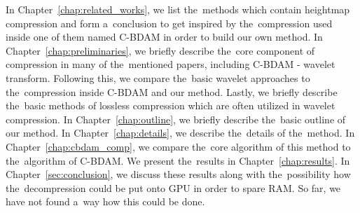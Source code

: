 In Chapter~\ref{chap:related_works}, we list the~methods which contain heightmap compression and form a~conclusion to get inspired by the~compression used inside one of them named C-BDAM in order to build our own method. In Chapter~\ref{chap:preliminaries}, we briefly describe the~core component of compression in many of the~mentioned papers, including C-BDAM - wavelet transform. Following this, we compare the~basic wavelet approaches to the~compression inside C-BDAM and our method. Lastly, we briefly describe the~basic methods of lossless compression which are often utilized in wavelet compression. In Chapter~\ref{chap:outline}, we briefly describe the~basic outline of our method. In Chapter~\ref{chap:details}, we describe the~details of the~method. In Chapter~\ref{chap:cbdam_comp}, we compare the~core algorithm of this method to the~algorithm of C-BDAM. We present the~results in Chapter~\ref{chap:results}. In Chapter~\ref{sec:conclusion}, we discuss these results along with the~possibility how the~decompression could be put onto GPU in order to spare RAM. So far, we have not found a~way how this could be done.